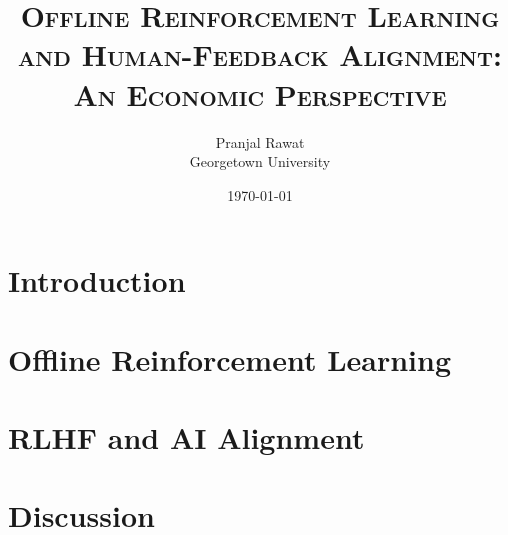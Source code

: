 %





\title{\textsc{Offline Reinforcement Learning and Human-Feedback Alignment:\\ An Economic Perspective}}
\author{Pranjal Rawat \\ Georgetown University}
\date{\today}

\maketitle

\begin{abstract}
\noindent
\end{abstract}

\tableofcontents
\newpage

\section{Introduction}\label{section:intro}

\section{Offline Reinforcement Learning}\label{section:offline_rl}


\section{RLHF and AI Alignment}\label{section:rlhf}


\section{Discussion}\label{section:conclusion}





